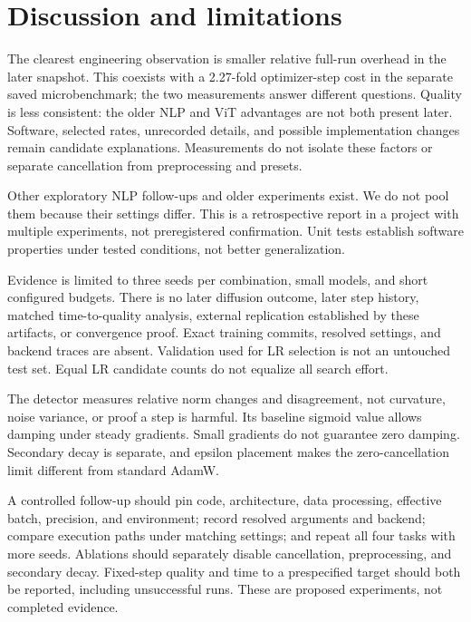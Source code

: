 \documentclass[11pt,a4paper]{article}
\begin{document}
\section{Discussion and limitations}

The clearest engineering observation is smaller relative full-run overhead in the later snapshot. This coexists with a 2.27-fold optimizer-step cost in the separate saved microbenchmark; the two measurements answer different questions. Quality is less consistent: the older NLP and ViT advantages are not both present later. Software, selected rates, unrecorded  details, and possible implementation changes remain candidate explanations. Measurements do not isolate these factors or separate cancellation from preprocessing and presets.

Other exploratory NLP follow-ups and older experiments exist. We do not pool them because their settings differ. This is a retrospective report in a project with multiple experiments, not preregistered confirmation. Unit tests establish software properties under tested conditions, not better generalization.

Evidence is limited to three seeds per combination, small models, and short configured budgets. There is no later diffusion outcome, later step history, matched time-to-quality analysis, external replication established by these artifacts, or convergence proof. Exact training commits, resolved settings, and backend traces are absent. Validation used for LR selection is not an untouched test set. Equal LR candidate counts do not equalize all search effort.

The detector measures relative norm changes and disagreement, not curvature, noise variance, or proof a step is harmful. Its baseline sigmoid value allows damping under steady gradients. Small gradients do not guarantee zero damping. Secondary decay is separate, and epsilon placement makes the zero-cancellation limit different from standard AdamW.

A controlled follow-up should pin code, architecture, data processing, effective batch, precision, and environment; record resolved arguments and backend; compare execution paths under matching settings; and repeat all four tasks with more seeds. Ablations should separately disable cancellation, preprocessing, and secondary decay. Fixed-step quality and time to a prespecified target should both be reported, including unsuccessful runs. These are proposed experiments, not completed evidence.
\end{document}
